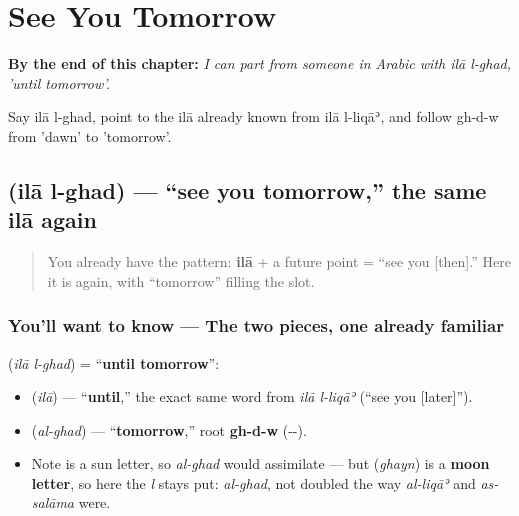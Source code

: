 
\chapter{See You Tomorrow}
\label{ch:ar-see-you-tomorrow}

\begin{chapteropening}
\textbf{By the end of this chapter:} \emph{I can part from someone in Arabic with ilā l-ghad, 'until tomorrow'.}

Say ilā l-ghad, point to the ilā already known from ilā l-liqāʾ, and follow gh-d-w from 'dawn' to 'tomorrow'.
\end{chapteropening}

\section[\texorpdfstring{\ar{إلى} \ar{الغد} (ilā l-ghad)}{إلى الغد (ilā l-ghad)}]{  (ilā l-ghad) — \textquotedblleft{}see you tomorrow,\textquotedblright{} the same ilā again}

\label{lesson:AR-C24-ila-al-ghad}



\begin{quote}
You already have the pattern: \textbf{ilā} + a future point = \textquotedblleft{}see you {[}then{]}.\textquotedblright{} Here it is again, with \textquotedblleft{}tomorrow\textquotedblright{} filling the slot.
\end{quote}

\subsection*{You'll want to know — The two pieces, one already familiar}
\textbf{ } (\emph{ilā l-ghad}) = \textquotedblleft{}\textbf{until tomorrow}\textquotedblright{}:

\begin{itemize}
\raggedright
  \item \textbf{} (\emph{ilā}) — \textquotedblleft{}\textbf{until},\textquotedblright{} the exact same word from \emph{ilā l-liqāʾ} (\textquotedblleft{}see you {[}later{]}\textquotedblright{}).
  \item \textbf{} (\emph{al-ghad}) — \textquotedblleft{}\textbf{tomorrow},\textquotedblright{} root \textbf{gh-d-w} (--).
  \item Note \textbf{} is a sun letter, so \emph{al-ghad} would assimilate — but \textbf{} (\emph{ghayn}) is a \textbf{moon letter}, so here the \emph{l} stays put: \emph{al-ghad}, not doubled the way \emph{al-liqāʾ} and \emph{as-salāma} were.
\end{itemize}

